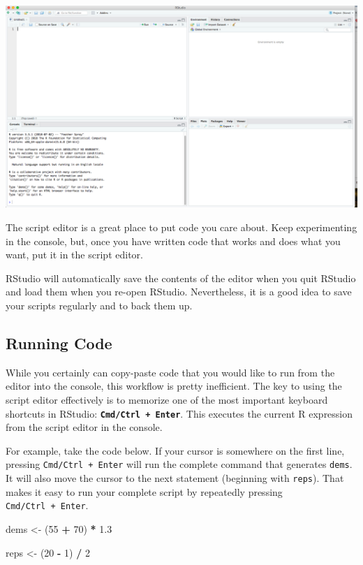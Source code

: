 \documentclass[]{book}
\newenvironment{Shaded}{\begin{snugshade}}{\end{snugshade}}
\newcommand{\DecValTok}[1]{\textcolor[rgb]{0.00,0.00,0.81}{#1}}
\newcommand{\FloatTok}[1]{\textcolor[rgb]{0.00,0.00,0.81}{#1}}
\newcommand{\StringTok}[1]{\textcolor[rgb]{0.31,0.60,0.02}{#1}}
\newcommand{\OperatorTok}[1]{\textcolor[rgb]{0.81,0.36,0.00}{\textbf{#1}}}
\newcommand{\NormalTok}[1]{#1}
\begin{document}
\begin{center}\includegraphics[width=0.7\linewidth]{img/4-panes} \end{center}

The script editor is a great place to put code you care about. Keep
experimenting in the console, but, once you have written code that works
and does what you want, put it in the script editor.

RStudio will automatically save the contents of the editor when you quit
RStudio and load them when you re-open RStudio. Nevertheless, it is a
good idea to save your scripts regularly and to back them up.

\subsection{Running Code}\label{running-code}

While you certainly can copy-paste code that you would like to run from
the editor into the console, this workflow is pretty inefficient. The
key to using the script editor effectively is to memorize one of the
most important keyboard shortcuts in RStudio:
\textbf{\texttt{Cmd/Ctrl\ +\ Enter}}. This executes the current R
expression from the script editor in the console.

For example, take the code below. If your cursor is somewhere on the
first line, pressing \texttt{Cmd/Ctrl\ +\ Enter} will run the complete
command that generates \texttt{dems}. It will also move the cursor to
the next statement (beginning with \texttt{reps}). That makes it easy to
run your complete script by repeatedly pressing
\texttt{Cmd/Ctrl\ +\ Enter}.

\begin{Shaded}
\begin{Highlighting}[]
\NormalTok{dems <-}\StringTok{ }\NormalTok{(}\DecValTok{55} \OperatorTok{+}\StringTok{ }\DecValTok{70}\NormalTok{) }\OperatorTok{*}\StringTok{ }\FloatTok{1.3}

\NormalTok{reps <-}\StringTok{ }\NormalTok{(}\DecValTok{20} \OperatorTok{-}\StringTok{ }\DecValTok{1}\NormalTok{) }\OperatorTok{/}\StringTok{ }\DecValTok{2}
\end{Highlighting}
\end{Shaded}
\end{document}
